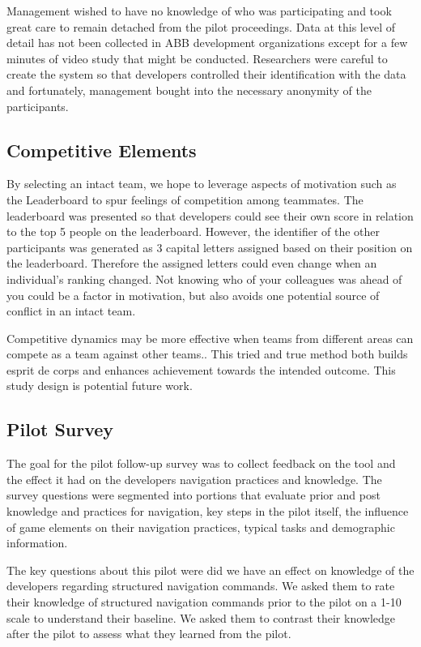 \documentclass{sig-alternate}
\begin{document}
Management wished to have no knowledge of who was participating and took great care to remain detached from the pilot proceedings.  Data at this level of detail has not been collected in ABB development organizations except for a few minutes of video study that might be conducted.  Researchers were careful to create the system so that developers controlled their identification with the data and fortunately, management bought into the necessary anonymity of the participants.

\subsection{Competitive Elements}
By selecting an intact team, we hope to leverage aspects of motivation such as the Leaderboard to spur feelings of competition among teammates.    The leaderboard was presented so that developers could see their own score in relation to the top 5 people on the leaderboard.  However, the identifier of the other participants was generated as 3 capital letters assigned based on their position on the leaderboard.  Therefore the assigned letters could even change when an individual's ranking changed.  Not knowing who of your colleagues was ahead of you could be a factor in motivation, but also avoids one potential source of conflict in an intact team.

Competitive dynamics may be more effective when teams from different areas can compete as a team against other teams..  This tried and true method both builds esprit de corps and enhances achievement towards the intended outcome.  This study design is potential future work. 

\subsection{Pilot Survey}

The goal for the pilot follow-up survey was to collect feedback on the tool and the effect it had on the developers navigation practices and knowledge.  The survey questions were segmented into portions that evaluate prior and post knowledge and practices for navigation, key steps in the pilot itself, the influence of game elements on their navigation practices, typical tasks and demographic information.

The key questions about this pilot were did we have an effect on knowledge of the developers regarding structured navigation commands.  We asked them to rate their knowledge of structured navigation commands prior to the pilot on a 1-10 scale to understand their baseline.  We asked them to contrast their knowledge after the pilot to assess what they learned from the pilot.
\end{document}
